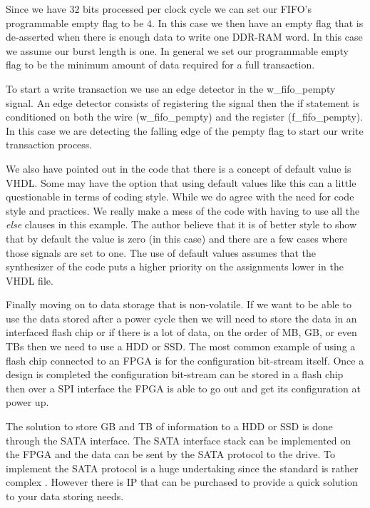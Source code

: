 Since we have $32$ bits processed per clock cycle we can set our \ac{FIFO}'s programmable empty flag to be $4$. In this case we then have an empty flag that is de-asserted when there is enough data to write one \ac{DDR}-\ac{RAM} word. In this case we assume our burst length is one. In general we set our programmable empty flag to be the minimum amount of data required for a full transaction. 

To start a write transaction we use an edge detector in the w\_fifo\_pempty signal. An edge detector consists of registering the signal then the if statement is conditioned on both the wire (w\_fifo\_pempty) and the register (f\_fifo\_pempty). In this case we are detecting the falling edge of the pempty flag to start our write transaction process.

We also have pointed out in the code that there is a concept of default value is \ac{VHDL}. Some may have the option that using default values like this can a little questionable in terms of coding style. While we do agree with the need for code style and practices. We really make a mess of the code with having to use all the \emph{else} clauses in this example. The author believe that it is of better style to show that by default the value is zero (in this case) and there are a few cases where those signals are set to one. The use of default values assumes that the synthesizer of the code puts a higher priority on the assignments lower in the \ac{VHDL} file. 

Finally moving on to data storage that is non-volatile. If we want to be able to use the data stored after a power cycle then we will need to store the data in an interfaced flash chip or if there is a lot of data, on the order of \ac{MB}, \ac{GB}, or even \ac{TB}s then we need to use a \ac{HDD} or \ac{SSD}. The most common example of using a flash chip connected to an \ac{FPGA} is for the configuration bit-stream itself. Once a design is completed the configuration bit-stream can be stored in a flash chip then over a \ac{SPI} interface the \ac{FPGA} is able to go out and get its configuration at power up. 

The solution to store \ac{GB} and \ac{TB} of information to a \ac{HDD} or \ac{SSD} is done through the \ac{SATA} interface. The \ac{SATA} interface stack can be implemented on the \ac{FPGA} and the data can be sent by the \ac{SATA} protocol to the drive. To implement the \ac{SATA} protocol is a huge undertaking since the standard is rather complex \cite{sata_std}. However there is \ac{IP} that can be purchased to provide a quick solution to your data storing needs. 	
	
